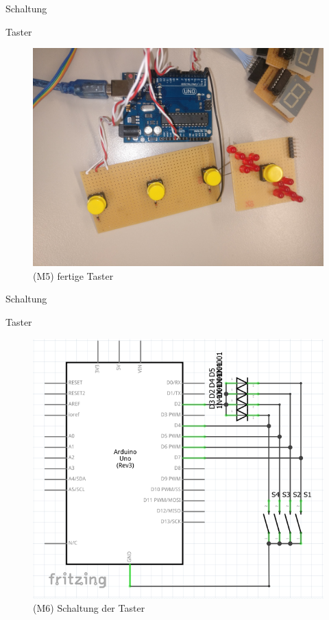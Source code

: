 \documentclass[mathserif,9pt]{article}
\begin{document}
    \begin{frame}{Schaltung}
        \begin{block}{Taster}
               \begin{figure}
                    \centering
                    \includegraphics[height=0.5\paperheight]{img/buttons-soldered.jpg}
                    \caption[M5]{(M5) fertige Taster}
                    \label{fig:taster}
               \end{figure}
        \end{block}
    \end{frame}
    
    \begin{frame}{Schaltung}
        \begin{block}{Taster}
               \begin{figure}
                    \centering
                    \includegraphics[height=0.5\paperheight]{img/taster_schaltung.png}
                    \caption[M6]{(M6) Schaltung der Taster}
                    \label{fig:taster_schaltung}
               \end{figure}
        \end{block}
    \end{frame}
\end{document}
